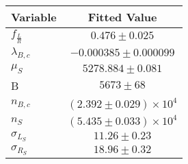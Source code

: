 \begin{tabular}[t]{lc}
\hline
Variable &Fitted Value\\
\hline\hline
$f_{\frac{L}{R}}$&$0.476\pm0.025$\\
\hline
$\lambda_{B,c}$&$-0.000385\pm0.000099$\\
\hline
$\mu_S$&$5278.884\pm0.081$\\
\hline
B&$5673\pm68$\\
\hline
$n_{B,c}$&$(2.392\pm0.029)\times 10^4$\\
\hline
$n_S$&$(5.435\pm0.033)\times 10^4$\\
\hline
$\sigma_{L_S}$&$11.26\pm0.23$\\
\hline
$\sigma_{R_S}$&$18.96\pm0.32$\\
\hline
\end{tabular}
